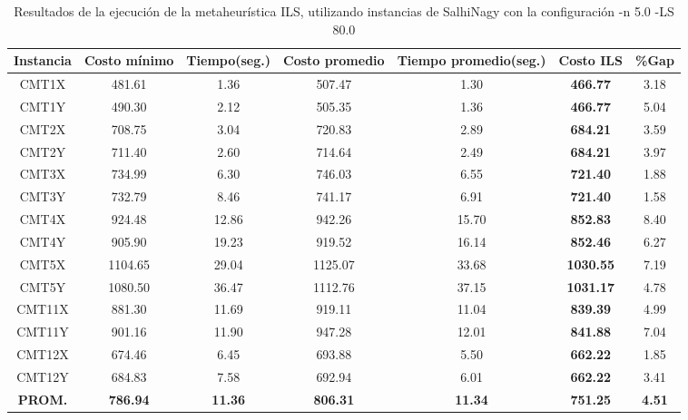 \begin{table}[ht]
\caption{Resultados de la ejecución de la metaheurística ILS, utilizando instancias de SalhiNagy con la configuración -n 5.0 -LS 80.0}
\centering
\small
\begin{tabular}{c c c c c c c}
\hline\hline
Instancia & Costo mínimo & Tiempo(seg.) & Costo promedio & Tiempo promedio(seg.) & Costo ILS & \%Gap \\ [0.5ex]
\hline
CMT1X & 481.61 & 1.36 & 
507.47 & 1.30 & \bf{466.77} & 
3.18\\CMT1Y & 490.30 & 2.12 & 
505.35 & 1.36 & \bf{466.77} & 
5.04\\CMT2X & 708.75 & 3.04 & 
720.83 & 2.89 & \bf{684.21} & 
3.59\\CMT2Y & 711.40 & 2.60 & 
714.64 & 2.49 & \bf{684.21} & 
3.97\\CMT3X & 734.99 & 6.30 & 
746.03 & 6.55 & \bf{721.40} & 
1.88\\CMT3Y & 732.79 & 8.46 & 
741.17 & 6.91 & \bf{721.40} & 
1.58\\CMT4X & 924.48 & 12.86 & 
942.26 & 15.70 & \bf{852.83} & 
8.40\\CMT4Y & 905.90 & 19.23 & 
919.52 & 16.14 & \bf{852.46} & 
6.27\\CMT5X & 1104.65 & 29.04 & 
1125.07 & 33.68 & \bf{1030.55} & 
7.19\\CMT5Y & 1080.50 & 36.47 & 
1112.76 & 37.15 & \bf{1031.17} & 
4.78\\CMT11X & 881.30 & 11.69 & 
919.11 & 11.04 & \bf{839.39} & 
4.99\\CMT11Y & 901.16 & 11.90 & 
947.28 & 12.01 & \bf{841.88} & 
7.04\\CMT12X & 674.46 & 6.45 & 
693.88 & 5.50 & \bf{662.22} & 
1.85\\CMT12Y & 684.83 & 7.58 & 
692.94 & 6.01 & \bf{662.22} & 
3.41\\\bf{PROM.} & 
\bf{786.94} & \bf{11.36} & \bf{806.31} & \bf{11.34} & \bf{751.25} & \bf{4.51}\\[1ex]\hline
\end{tabular}
\label{table:nonlin}
\end{table} \clearpage
